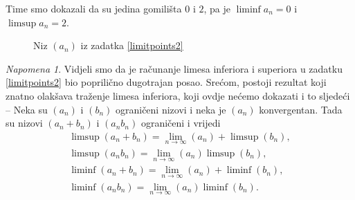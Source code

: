 \documentclass{book}
\renewenvironment{proof}{%
    \vspace{-\parskip}\begin{oldproof}%
    }{%
    \end{oldproof}%
}
\theoremstyle{definition}
\theoremstyle{definition}
\theoremstyle{remark}
\newtheorem{remark}{Napomena}
\begin{document}
\begin{proof}[Rješenje]
Time smo dokazali da su jedina gomilišta $0$ i $2$, pa je $\liminf{a_n}=0$ i $\limsup{a_n}=2$.
\begin{figure}[ht]
\begin{center}
\caption{Niz $(a_n)$ iz zadatka \ref{limitpoints2}}
\label{fig:6.1}
\end{center}
\end{figure}
\end{proof}
\begin{remark}
Vidjeli smo da je računanje limesa inferiora i superiora u zadatku \ref{limitpoints2} bio poprilično dugotrajan posao. Srećom, postoji rezultat koji znatno olakšava traženje limesa inferiora, koji ovdje nećemo dokazati i to sljedeći -- Neka su $(a_n)$ i $(b_n)$ ograničeni nizovi i neka je $(a_n)$ konvergentan. Tada su nizovi $(a_n+b_n)$ i $(a_nb_n)$ ograničeni i vrijedi
\begin{gather*}
\limsup(a_n+b_n)=\lim\limits_{n\to \infty}(a_n)+\limsup(b_n),\\
\limsup(a_nb_n)=\lim\limits_{n\to \infty}(a_n)\limsup(b_n),\\
\liminf(a_n+b_n)=\lim\limits_{n\to \infty}(a_n)+\liminf(b_n),\\
\liminf(a_nb_n)=\lim\limits_{n\to \infty}(a_n)\liminf(b_n).
\end{gather*}
\end{remark}
\newpage
\end{document}

